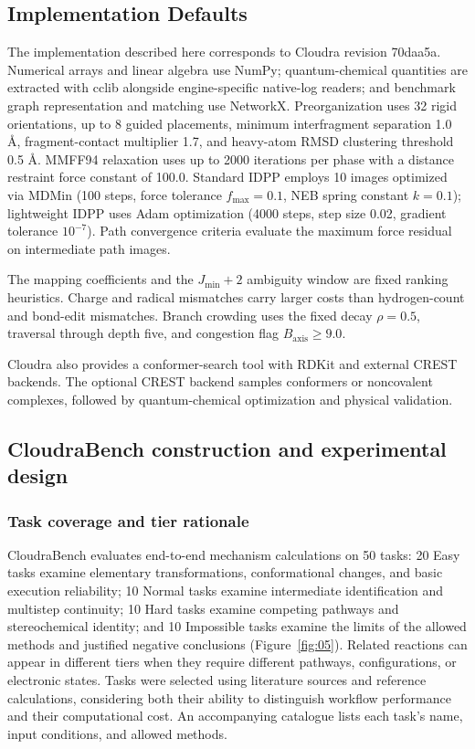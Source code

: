 \subsection{Implementation Defaults}
The implementation described here corresponds to Cloudra revision 70daa5a.\citep{ref14} Numerical arrays and linear algebra use NumPy\citep{numpy2020}; quantum-chemical quantities are extracted with cclib alongside engine-specific native-log readers\citep{cclib2008}; and benchmark graph representation and matching use NetworkX\citep{networkx2008}. Preorganization uses 32 rigid orientations, up to 8 guided placements, minimum interfragment separation 1.0 Å, fragment-contact multiplier 1.7, and heavy-atom RMSD clustering threshold 0.5 Å. MMFF94 relaxation uses up to 2000 iterations per phase with a distance restraint force constant of 100.0. Standard IDPP employs 10 images optimized via MDMin (100 steps, force tolerance $f_{\max}=0.1$, NEB spring constant $k=0.1$); lightweight IDPP uses Adam optimization (4000 steps, step size 0.02, gradient tolerance $10^{-7}$). Path convergence criteria evaluate the maximum force residual on intermediate path images.\par

The mapping coefficients and the $J_{\min}+2$ ambiguity window are fixed ranking heuristics. Charge and radical mismatches carry larger costs than hydrogen-count and bond-edit mismatches. Branch crowding uses the fixed decay $\rho=0.5$, traversal through depth five, and congestion flag $B_{\mathrm{axis}}\geq9.0$.

Cloudra also provides a conformer-search tool with RDKit and external CREST backends.\citep{crest2020} The optional CREST backend samples conformers or noncovalent complexes, followed by quantum-chemical optimization and physical validation.

\subsection{CloudraBench construction and experimental design}

\subsubsection{Task coverage and tier rationale}



CloudraBench evaluates end-to-end mechanism calculations on 50 tasks: 20 Easy tasks examine elementary transformations, conformational changes, and basic execution reliability; 10 Normal tasks examine intermediate identification and multistep continuity; 10 Hard tasks examine competing pathways and stereochemical identity; and 10 Impossible tasks examine the limits of the allowed methods and justified negative conclusions (Figure~\ref{fig:05}). Related reactions can appear in different tiers when they require different pathways, configurations, or electronic states. Tasks were selected using literature sources and reference calculations, considering both their ability to distinguish workflow performance and their computational cost. An accompanying catalogue lists each task's name, input conditions, and allowed methods.

